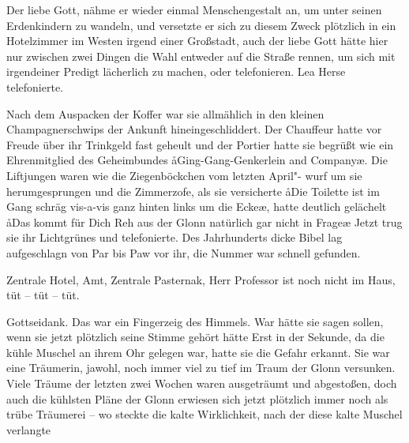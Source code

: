 

Der liebe Gott, nähme er wieder einmal Menschengestalt an,
um unter seinen Erdenkindern zu wandeln, und versetzte er
sich zu diesem Zweck plötzlich in ein Hotelzimmer im Westen
irgend einer Großstadt, auch der liebe Gott hätte hier nur
zwischen zwei Dingen die Wahl\dopp{} entweder auf die Straße
rennen, um sich mit irgendeiner Predigt lächerlich zu machen,
oder telefonieren. Lea Herse telefonierte.

Nach dem Auspacken der Koffer war sie allmählich in den
kleinen Champagnerschwips der Ankunft hineingeschliddert.
Der Chauffeur hatte vor Freude über ihr Trinkgeld fast geheult
und der Portier hatte sie begrüßt wie ein Ehrenmitglied des
Geheimbundes \aa{}Ging-Gang-Genkerlein and Company\ae{}. Die
Liftjungen waren wie die Ziegenböckchen vom letzten April"-%
wurf um sie herumgesprungen und die Zimmerzofe, als sie
versicherte\dopp{} \aa{}Die Toilette ist im Gang schräg vis-a-vis ganz
hinten links um die Ecke\ae{}, hatte deutlich gelächelt\dopp{} \aa{}Das
kommt für Dich Reh aus der Glonn natürlich gar nicht in
Frage\ausr{}\ae{} Jetzt trug sie ihr Lichtgrünes und telefonierte. Des
Jahrhunderts dicke Bibel lag aufgeschlagn von Par bis Paw
vor ihr, die Nummer war schnell gefunden.

Zentrale Hotel, Amt, Zentrale Pasternak, Herr Professor
ist noch nicht im Haus, tüt -- tüt -- tüt.

Gottseidank. Das war ein Fingerzeig des Himmels. War hätte
sie sagen sollen, wenn sie jetzt plötzlich seine Stimme gehört
hätte\frag{} Erst in der Sekunde, da die kühle Muschel an ihrem
Ohr gelegen war, hatte sie die Gefahr erkannt. Sie war eine
Träumerin, jawohl, noch immer viel zu tief im Traum der
Glonn versunken. Viele Träume der letzten zwei Wochen
waren ausgeträumt und abgestoßen, doch auch die kühlsten
Pläne der Glonn erwiesen sich jetzt plötzlich immer noch als
trübe Träumerei -- wo steckte die kalte Wirklichkeit, nach der
diese kalte Muschel verlangte\frag{}\label{lS44-1}

